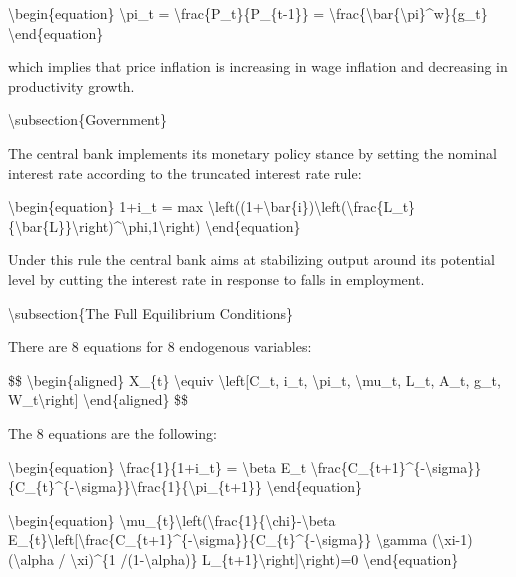 \documentclass[10pt,math=newtx,citestyle=gb7714-2015,bibstyle=gb7714-2015]{elegantbook}
\begin{document}
	\textbackslash{}begin\{equation\}
	\textbackslash{}pi\_t = \textbackslash{}frac\{P\_t\}\{P\_\{t-1\}\} = \textbackslash{}frac\{\textbackslash{}bar\{\textbackslash{}pi\}\^{}w\}\{g\_t\}
	\textbackslash{}end\{equation\}
	
	which implies that price inflation is increasing in wage inflation and decreasing in productivity growth.
	
	\textbackslash{}subsection\{Government\}
	
	The central bank implements its monetary policy stance by setting the nominal interest rate according to the truncated interest rate rule:
	
	\textbackslash{}begin\{equation\}
	1+i\_t = max \textbackslash{}left((1+\textbackslash{}bar\{i\})\textbackslash{}left(\textbackslash{}frac\{L\_t\}\{\textbackslash{}bar\{L\}\}\textbackslash{}right)\^{}\textbackslash{}phi,1\textbackslash{}right)
	\textbackslash{}end\{equation\}
	
	Under this rule the central bank aims at stabilizing output around its potential level by cutting the interest rate in response to falls in employment.
	
	\textbackslash{}subsection\{The Full Equilibrium Conditions\}
	
	There are 8 equations for 8 endogenous variables:
	
	\$\$
	\textbackslash{}begin\{aligned\}
	X\_\{t\} \textbackslash{}equiv \textbackslash{}left[C\_t, i\_t, \textbackslash{}pi\_t, \textbackslash{}mu\_t, L\_t, A\_t, g\_t, W\_t\textbackslash{}right]
	\textbackslash{}end\{aligned\}
	\$\$
	
	The 8 equations are the following:
	
	\textbackslash{}begin\{equation\}
	\textbackslash{}frac\{1\}\{1+i\_t\} = \textbackslash{}beta E\_t \textbackslash{}frac\{C\_\{t+1\}\^{}\{-\textbackslash{}sigma\}\}\{C\_\{t\}\^{}\{-\textbackslash{}sigma\}\}\textbackslash{}frac\{1\}\{\textbackslash{}pi\_\{t+1\}\}
	\textbackslash{}end\{equation\}
	
	\textbackslash{}begin\{equation\}
	\textbackslash{}mu\_\{t\}\textbackslash{}left(\textbackslash{}frac\{1\}\{\textbackslash{}chi\}-\textbackslash{}beta E\_\{t\}\textbackslash{}left[\textbackslash{}frac\{C\_\{t+1\}\^{}\{-\textbackslash{}sigma\}\}\{C\_\{t\}\^{}\{-\textbackslash{}sigma\}\} \textbackslash{}gamma (\textbackslash{}xi-1)(\textbackslash{}alpha / \textbackslash{}xi)\^{}\{1 /(1-\textbackslash{}alpha)\} L\_\{t+1\}\textbackslash{}right]\textbackslash{}right)=0
	\textbackslash{}end\{equation\}
	
\end{document}
